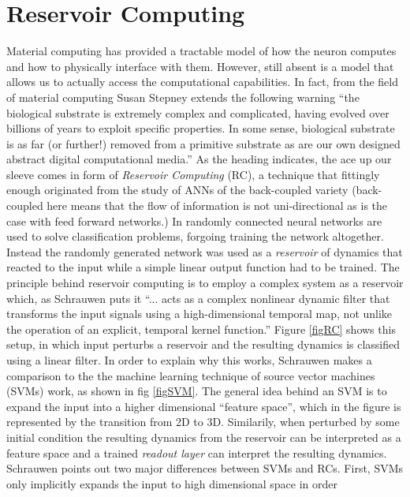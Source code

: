 \section{Reservoir Computing}
Material computing has provided a tractable model of how the neuron computes and
how to physically interface with them.
However, still absent is a model that allows us to actually access the
computational capabilities.
In fact, from the field of material computing Susan Stepney extends the
following warning ``the biological substrate is extremely complex and
complicated, having evolved over billions of years to exploit specific
properties. In some sense, biological substrate is as far (or further!) removed
from a primitive substrate as are our own designed abstract digital
computational media.''
%
As the heading indicates, the ace up our sleeve comes in form of \emph{Reservoir
  Computing} (RC), a technique that fittingly enough originated from the study of
ANNs of the back-coupled variety\cite{jaeger_echo}\cite{natschlager2002liquid}
(back-coupled here means that the flow of information is not uni-directional as
is the case with feed forward networks.)
In \cite{jaeger_echo} randomly connected neural networks are used to solve
classification problems, forgoing training the network altogether.
Instead the randomly generated network was used as a \emph{reservoir} of
dynamics that reacted to the input while a simple linear output function had to
be trained.
The principle behind reservoir computing is to employ a complex system as a
reservoir which, as Schrauwen puts it \cite{schrauwen_overview_2007} ``... acts
as a complex nonlinear dynamic filter that transforms the input signals using a
high-dimensional temporal map, not unlike the operation of an explicit, temporal
kernel function.''
Figure \ref{figRC} shows this setup, in which input perturbs a reservoir and the
resulting dynamics is classified using a linear filter.
%
In order to explain why this works, Schrauwen makes a comparison to the the
machine learning technique of source vector machines (SVMs) work, as shown in fig
\ref{figSVM}.
The general idea behind an SVM is to expand the input into a higher dimensional
``feature space'', which in the figure is represented by the transition from 2D
to 3D.
Similarily, when perturbed by some initial condition the resulting dynamics from
the reservoir can be interpreted as a feature space and a trained \emph{readout
layer} can interpret the resulting dynamics.
Schrauwen points out two major differences between SVMs and RCs.
First, SVMs only implicitly expands the input to high dimensional space in order
